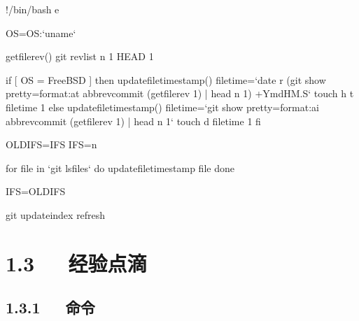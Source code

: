 \documentclass[letterpaper,12pt,english]{sphinxmanual}
\begin{document}
\begin{sphinxVerbatim}[commandchars=\\\{\}]
\PYGZsh{}!/bin/bash \PYGZhy{}e

OS=\PYGZdl{}\PYGZob{}OS:\PYGZhy{}`uname`\PYGZcb{}

get\PYGZus{}file\PYGZus{}rev() \PYGZob{}
    git rev\PYGZhy{}list \PYGZhy{}n 1 HEAD \PYGZdq{}\PYGZdl{}1\PYGZdq{}
\PYGZcb{}

if [ \PYGZdq{}\PYGZdl{}OS\PYGZdq{} = \PYGZsq{}FreeBSD\PYGZsq{} ]
then
    update\PYGZus{}file\PYGZus{}timestamp() \PYGZob{}
        file\PYGZus{}time=`date \PYGZhy{}r \PYGZdq{}\PYGZdl{}(git show \PYGZhy{}\PYGZhy{}pretty=format:\PYGZpc{}at   \PYGZhy{}\PYGZhy{}abbrev\PYGZhy{}commit \PYGZdq{}\PYGZdl{}(get\PYGZus{}file\PYGZus{}rev \PYGZdq{}\PYGZdl{}1\PYGZdq{})\PYGZdq{} | head \PYGZhy{}n 1)\PYGZdq{}   \PYGZsq{}+\PYGZpc{}Y\PYGZpc{}m\PYGZpc{}d\PYGZpc{}H\PYGZpc{}M.\PYGZpc{}S\PYGZsq{}`
        touch \PYGZhy{}h \PYGZhy{}t \PYGZdq{}\PYGZdl{}file\PYGZus{}time\PYGZdq{} \PYGZdq{}\PYGZdl{}1\PYGZdq{}
    \PYGZcb{}
else
    update\PYGZus{}file\PYGZus{}timestamp() \PYGZob{}
        file\PYGZus{}time=`git show \PYGZhy{}\PYGZhy{}pretty=format:\PYGZpc{}ai \PYGZhy{}\PYGZhy{}abbrev\PYGZhy{}commit   \PYGZdq{}\PYGZdl{}(get\PYGZus{}file\PYGZus{}rev \PYGZdq{}\PYGZdl{}1\PYGZdq{})\PYGZdq{} | head \PYGZhy{}n 1`
        touch \PYGZhy{}d \PYGZdq{}\PYGZdl{}file\PYGZus{}time\PYGZdq{} \PYGZdq{}\PYGZdl{}1\PYGZdq{}
    \PYGZcb{}
fi

OLD\PYGZus{}IFS=\PYGZdl{}IFS
IFS=\PYGZdl{}\PYGZsq{}\PYGZbs{}n\PYGZsq{}

for file in `git ls\PYGZhy{}files`
do
    update\PYGZus{}file\PYGZus{}timestamp \PYGZdq{}\PYGZdl{}file\PYGZdq{}
done

IFS=\PYGZdl{}OLD\PYGZus{}IFS

git update\PYGZhy{}index \PYGZhy{}\PYGZhy{}refresh
\end{sphinxVerbatim}


\section{1.3   经验点滴}
\label{\detokenize{001software/001install/001._u7f51_u7ad9/github:id4}}

\subsection{1.3.1   命令}
\label{\detokenize{001software/001install/001._u7f51_u7ad9/github:id5}}
\end{document}
